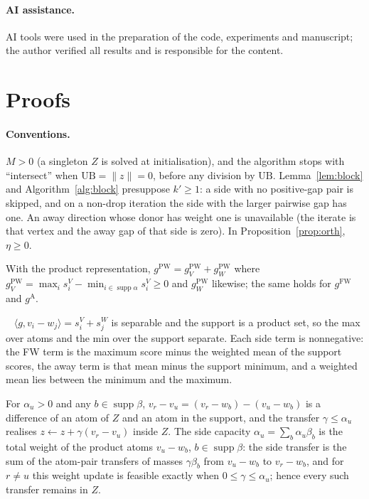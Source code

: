 \documentclass{opt2026}   %
\renewenvironment{proof}[1][]{\par\noindent{\bfseries\upshape Proof#1.}\ }{\jmlrQED}
\newcommand{\ip}[2]{\langle #1, #2 \rangle}
\newcommand{\norm}[1]{\lVert #1 \rVert}
\newcommand{\gFW}{g^{\mathrm{FW}}}
\newcommand{\gA}{g^{\mathrm{A}}}
\newcommand{\gPW}{g^{\mathrm{PW}}}
\newcommand{\UB}{\mathrm{UB}}
\begin{document}
\paragraph{AI assistance.} AI tools were used in the preparation of the
code, experiments and manuscript; the author verified all results and
is responsible for the content.

\appendix
\section{Proofs}\label{app:proofs}

\paragraph{Conventions.} $M>0$ (a singleton $Z$ is solved at
initialisation), and the algorithm stops with ``intersect'' when
$\UB=\norm z=0$, before any division by $\UB$. Lemma~\ref{lem:block}
and Algorithm~\ref{alg:block} presuppose $k'\ge1$: a side with no
positive-gap pair is skipped, and on a non-drop iteration the side with
the larger pairwise gap has one. An away direction whose donor has
weight one is unavailable (the iterate is that vertex and the away gap
of that side is zero). In Proposition~\ref{prop:orth}, $\eta\ge0$.

\begin{lemma}[Separability]\label{lem:sep}
With the product representation, $\gPW=\gPW_V+\gPW_W$ where
$\gPW_V=\max_is^V_i-\min_{i\in\operatorname{supp}\alpha}s^V_i\ge0$ and
$\gPW_W$ likewise; the same holds for $\gFW$ and $\gA$.
\end{lemma}
\begin{proof}
$\ip{g}{v_i-w_j}=s^V_i+s^W_j$ is separable and the support is a product
set, so the max over atoms and the min over the support separate. Each
side term is nonnegative: the FW term is the maximum score minus the
weighted mean of the support scores, the away term is that mean minus
the support minimum, and a weighted mean lies between the minimum and
the maximum.
\end{proof}

\begin{lemma}\label{lem:side}
For $\alpha_u>0$ and any $b\in\operatorname{supp}\beta$,
$v_r-v_u=(v_r-w_b)-(v_u-w_b)$ is a difference of an atom of $Z$ and an
atom in the support, and the transfer $\gamma\le\alpha_u$ realises
$z\leftarrow z+\gamma(v_r-v_u)$ inside $Z$. The side capacity
$\alpha_u=\sum_{b}\alpha_u\beta_b$ is the total weight of the product
atoms $v_u-w_b$, $b\in\operatorname{supp}\beta$: the side transfer is
the sum of the atom-pair transfers of masses $\gamma\beta_b$ from
$v_u-w_b$ to $v_r-w_b$, and for $r\ne u$ this weight update is feasible
exactly when $0\le\gamma\le\alpha_u$; hence every such transfer remains
in $Z$.
\end{lemma}
\end{document}
